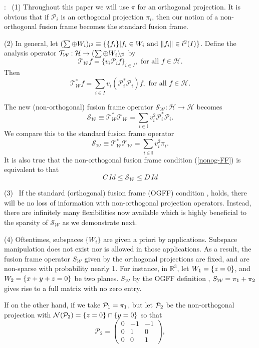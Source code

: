 \documentclass[11pt,reqno]{amsart}
\theoremstyle{remark}
\begin{document}
: \
(1)  Throughout this paper we will use $\pi$ for an orthogonal projection.
It is obvious that if ${{\mathcal P}}_i$ is an orthogonal projection $\pi_i$, then our notion
of a non-orthogonal fusion frame becomes the standard fusion frame.

(2)  In general, let ${\displaystyle}(\sum \oplus W_i)_{l^2} \equiv \{\{f_i\} | f_i\in W_i \ \text{and}\  \|f_i\|\in l^2(I)\}$.
 Define the analysis operator ${\displaystyle}{{\mathcal T}}_{{\mathcal W}} :{\mathcal H}\rightarrow (\sum \oplus W_i)_{l^2}$ by
\[
  {{\mathcal T}}_{{\mathcal W}} f =\{v_i{{\mathcal P}}_i f\}_{i\in I},\mbox{ for all } f\in {\mathcal H}.
\]
Then
\[
 {{\mathcal T}}_{{\mathcal W}}^* f =\sum_{i\in I} v_i\left({{\mathcal P}}_i^*{{\mathcal P}}_i\right) f,\mbox{ for all }f\in {\mathcal H}.
\]

The new (non-orthogonal) fusion frame operator ${{\mathcal S}_{{\mathcal W}}} :{\mathcal H} \rightarrow {\mathcal H}$ becomes
\[
 {{\mathcal S}_{{\mathcal W}}} \equiv {{\mathcal T}}_{{\mathcal W}}^*{{\mathcal T}}_{{\mathcal W}} = \sum_{i\in{\mathbb I}} v_i^2{{\mathcal P}}_i^*{{\mathcal P}}_i.
\]
We compare this to the standard fusion frame operator
\[
 {{\mathcal S}_{{\mathcal W}}} \equiv {{\mathcal T}}_{{\mathcal W}}^*{{\mathcal T}}_{{\mathcal W}} = \sum_{i\in{\mathbb I}} v_i^2\pi_i.
\]
It is also true that the non-orthogonal fusion frame condition (\ref{nonog-FF}) is equivalent to that
\[
 C\,Id \leq {{\mathcal S}_{{\mathcal W}}}  \leq D\, Id
\]

(3)  \ If the standard (orthogonal) fusion frame (OGFF) condition \cite{CK04}, \cite{CKL08} holds, there will be no loss of information with non-orthogonal projection operators.   Instead, there are infinitely many flexibilities
now available which is highly beneficial to the sparsity of ${{\mathcal S}_{{\mathcal W}}}$ as we demonstrate next.

(4)  Oftentimes, subspaces $\{W_i\}$ are given a priori by applications.  Subspace manipulation does not exist nor is allowed in those applications.  As a result, the fusion frame operator ${S_{{\mathcal W}}}$ given by the orthogonal projections are fixed, and are non-sparse with probability nearly 1.  For instance, in ${\mathbb R}^3$, let ${\displaystyle} W_1=\{z=0\}$, and ${\displaystyle} W_2=\{x+y+z=0\}$ be two planes.   ${S_{{\mathcal W}}}$ by the OGFF definition \cite{CK04}, \cite{CKL08} ${\displaystyle}{S_{{\mathcal W}}} = \pi_1+\pi_2 $ gives rise to a full matrix with no zero entry.

If on the other hand, if we take ${\displaystyle} {{\mathcal P}}_1=\pi_1$, but let ${\displaystyle} {{\mathcal P}}_2$ be the non-orthogonal
projection with ${\displaystyle}{{\mathcal N}}({{\mathcal P}}_2)=\{z=0\} \cap \{y=0\}$ so that
\[
{{\mathcal P}}_2 =\left(\begin{array}{ccc}
  0 & -1 & -1 \\
  0 & 1 & 0 \\
  0 & 0 & 1\end{array}\right),
\]
\end{document}
